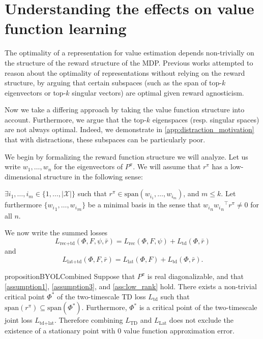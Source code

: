 \section{Understanding the effects on value function learning}
\label{sec:auxilliary_tasks}

The optimality of a representation for value estimation depends non-trivially on the structure of the reward structure of the MDP. Previous works \parencite{behzadian2019fast, bellemare2019geometric, lelan2022generalization} attempted to reason about the optimality of representations without relying on the reward structure, by arguing that certain subspaces (such as the span of top-$k$ eigenvectors or top-$k$ singular vectors) are optimal given reward agnosticism.

Now we take a differing approach by taking the value function structure into account. Furthermore, we argue that the top-$k$ eigenspaces (resp. singular spaces) are not always optimal. Indeed, we demonstrate in \cref{app:distraction_motivation} that with distractions, these subspaces can be particularly poor.


We begin by formalizing the reward function structure we will analyze. 
Let us write $w_1,\dots,w_n$ for the eigenvectors of $P^\pi$. 
We will assume that $r^\pi$ has a low-dimensional structure in the following sense: 

\begin{assumption}\label{ass:low_rank}
    $\exists i_1,\dots,i_m \in \{1,\dots,|\mathcal{X}|\}$ such that $r^\pi \in \mathrm{span}(w_{i_1},\dots,w_{i_m})$, and $m\leq k.$ Let furthermore $\{{w_i}_1,\dots,{w_i}_m\}$ be a minimal basis in the sense that ${w_i}_n {{w_i}_n}^\top r^\pi \neq 0$ for all $n$. 
\end{assumption}
We now write the summed losses $$L_{\text{rec}+\text{td}}(\Phi,F,\psi,\bar{r})= L_\text{rec}(\Phi, F, \psi)+L_\text{td}(\Phi, \bar r)$$ and $$L_{\text{lat}+\text{td}}(\Phi,F,\bar{r})= L_\text{lat}(\Phi, F)+L_\text{td}(\Phi, \bar r).$$ 


\begin{restatable}{proposition}{BYOLCombined}\label{prop:BYOLCombined}
    Suppose that $P^\pi$ is real diagonalizable, and that \autoref{assumption1}, \autoref{assumption3}, and \autoref{ass:low_rank} hold. 
    There exists a non-trivial critical point $\Phi^*$ of the two-timescale TD loss $L_\text{td}$ such that $\mathrm{span}(r^\pi)\subseteq \mathrm{span}(\Phi^*)$. 
    Furthermore, $\Phi^*$ is a critical point of the two-timescale joint loss $L_{\text{td}+\text{lat}}$. Therefore combining $L_\text{TD}$ and $L_\text{Lat}$ does not exclude the existence of a stationary point with $0$ value function approximation error.
\end{restatable}

